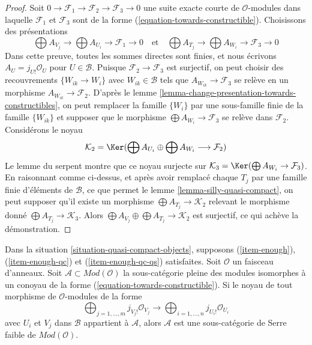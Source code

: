 \begin{proof}

Soit $0 \to \mathcal{F}_1 \to \mathcal{F}_2 \to \mathcal{F}_3 \to 0$
une suite exacte courte de $\mathcal{O}$-modules dans laquelle
$\mathcal{F}_1$ et $\mathcal{F}_3$ sont de la forme
(\ref{equation-towards-constructible}). Choisissons des présentations
$$
\bigoplus A_{V_j} \to \bigoplus A_{U_i} \to \mathcal{F}_1 \to 0
\quad\text{et}\quad
\bigoplus A_{T_j} \to \bigoplus A_{W_i} \to \mathcal{F}_3 \to 0
$$
Dans cette preuve, toutes les sommes directes sont finies, et nous écrivons
$A_U = j_{U!}\mathcal{O}_U$ pour $U \in \mathcal{B}$. Puisque
$\mathcal{F}_2 \to \mathcal{F}_3$ est surjectif, on peut choisir des
recouvrements $\{W_{ik} \to W_i\}$ avec $W_{ik} \in \mathcal{B}$ tels que
$A_{W_{ik}} \to \mathcal{F}_3$ se relève en un morphisme
$A_{W_{ik}} \to \mathcal{F}_2$. D'après le lemme
\ref{lemma-change-presentation-towards-constructibles}, on peut remplacer
la famille $\{W_i\}$ par une sous-famille finie de la famille
$\{W_{ik}\}$ et supposer que le morphisme
$\bigoplus A_{W_i} \to \mathcal{F}_3$ se relève dans $\mathcal{F}_2$.
Considérons le noyau
$$
\mathcal{K}_2 = \Ker(\bigoplus A_{U_i} \oplus \bigoplus A_{W_i}
\longrightarrow \mathcal{F}_2)
$$
Le lemme du serpent montre que ce noyau surjecte sur
$\mathcal{K}_3 = \Ker(\bigoplus A_{W_i} \to \mathcal{F}_3)$. En raisonnant
comme ci-dessus, et après avoir remplacé chaque $T_j$ par une famille finie
d'éléments de $\mathcal{B}$, ce que permet le lemme
\ref{lemma-silly-quasi-compact}, on peut supposer qu'il existe un morphisme
$\bigoplus A_{T_j} \to \mathcal{K}_2$ relevant le morphisme donné
$\bigoplus A_{T_j} \to \mathcal{K}_3$. Alors $\bigoplus A_{V_j} \oplus \bigoplus A_{T_j} \to \mathcal{K}_2$
est surjectif, ce qui achève la démonstration.

\end{proof}

\begin{lemma}

\label{lemma-towards-constructible-when-serre-subcategory}

Dans la situation \ref{situation-quasi-compact-objects}, supposons
(\ref{item-enough}), (\ref{item-enough-qc}) et
(\ref{item-enough-qc-qs}) satisfaites. Soit $\mathcal{O}$ un faisceau
d'anneaux. Soit $\mathcal{A} \subset \textit{Mod}(\mathcal{O})$ la
sous-catégorie pleine des modules isomorphes à un conoyau de la forme
(\ref{equation-towards-constructible}). Si le noyau de tout morphisme de
$\mathcal{O}$-modules de la forme
$$
\bigoplus\nolimits_{j = 1, \ldots, m} j_{V_j!}\mathcal{O}_{V_j}
\longrightarrow
\bigoplus\nolimits_{i = 1, \ldots, n} j_{U_i!}\mathcal{O}_{U_i}
$$
avec $U_i$ et $V_j$ dans $\mathcal{B}$ appartient à $\mathcal{A}$, alors
$\mathcal{A}$ est une sous-catégorie de Serre faible de
$\textit{Mod}(\mathcal{O})$.

\end{lemma}

